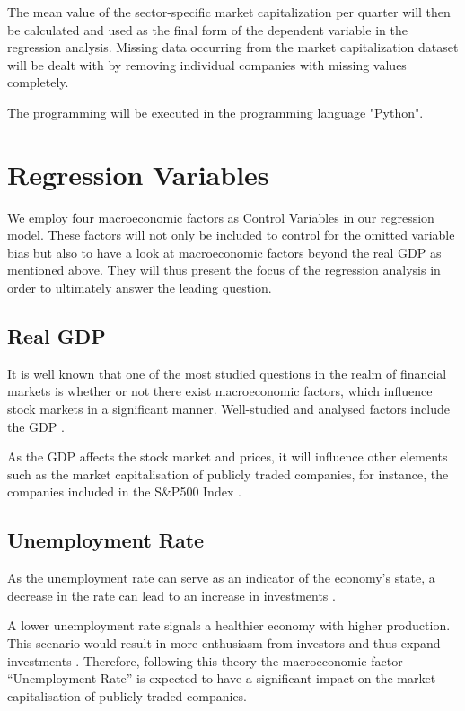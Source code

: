 \documentclass[a4paper,12pt]{article}
\begin{document}
\noindent The mean value of the sector-specific market capitalization per quarter will then be calculated and used as the final form of the dependent variable in the regression analysis. Missing data occurring from the market capitalization dataset will be dealt with by removing individual companies with missing values completely.

\noindent The programming will be executed in the programming language "Python".

\clearpage
\section{Regression Variables}

We employ four macroeconomic factors as Control Variables in our regression model. These factors will not only be included to control for the omitted variable bias but also to have a look at macroeconomic factors beyond the real GDP as mentioned above. They will thus present the focus of the regression analysis in order to ultimately answer the leading question.

\subsection{Real GDP}

It is well known that one of the most studied questions in the realm of financial markets is whether or not there exist macroeconomic factors, which influence stock markets in a significant manner.
Well-studied and analysed factors include the GDP \citep{pilinkus2009short}.

\noindent As the GDP affects the stock market and prices, it will influence other elements such as the market capitalisation of publicly traded companies, for instance, the companies included in the S\&P500 Index \citep{pilinkus2009short}.

\subsection{Unemployment Rate}

As the unemployment rate can serve as an indicator of the economy’s state, a decrease in the rate can lead to an increase in investments \citep{Forbes2022}.

\noindent A lower unemployment rate signals a healthier economy with higher production. This scenario would result in more enthusiasm from investors and thus expand investments \citep{Forbes2022}. Therefore, following this theory the macroeconomic factor “Unemployment Rate” is expected to have a significant impact on the market capitalisation of publicly traded companies.
\end{document}
